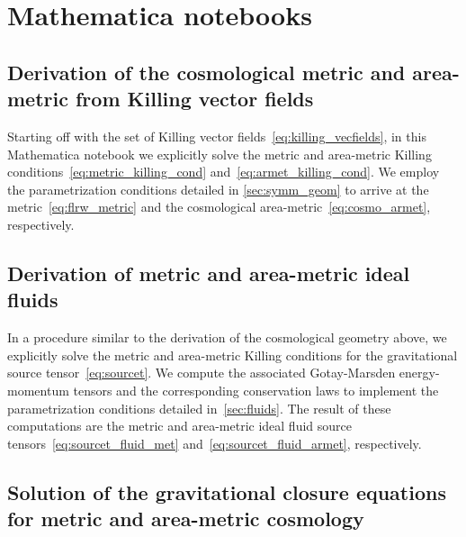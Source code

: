 \chapter{Mathematica notebooks}

\section{Derivation of the cosmological metric and area-metric from Killing vector fields}\label{nb:cosmo_geom}


Starting off with the set of Killing vector fields~\eqref{eq:killing_vecfields}, in this Mathematica notebook we explicitly solve the metric and area-metric Killing conditions~\eqref{eq:metric_killing_cond} and~\eqref{eq:armet_killing_cond}. We employ the parametrization conditions detailed in \autoref{sec:symm_geom} to arrive at the \FLRW{} metric~\eqref{eq:flrw_metric} and the cosmological area-metric~\eqref{eq:cosmo_armet}, respectively.

\section{Derivation of metric and area-metric ideal fluids}\label{nb:cosmo_em}


In a procedure similar to the derivation of the cosmological geometry above, we explicitly solve the metric and area-metric Killing conditions for the gravitational source tensor~\eqref{eq:sourcet}. We compute the associated Gotay-Marsden energy-momentum tensors and the corresponding conservation laws to implement the parametrization conditions detailed in~\autoref{sec:fluids}. The result of these computations are the metric and area-metric ideal fluid source tensors~\eqref{eq:sourcet_fluid_met} and~\eqref{eq:sourcet_fluid_armet}, respectively.

\section{Solution of the gravitational closure equations for metric and area-metric cosmology}\label{nb:constr_cosmo}


